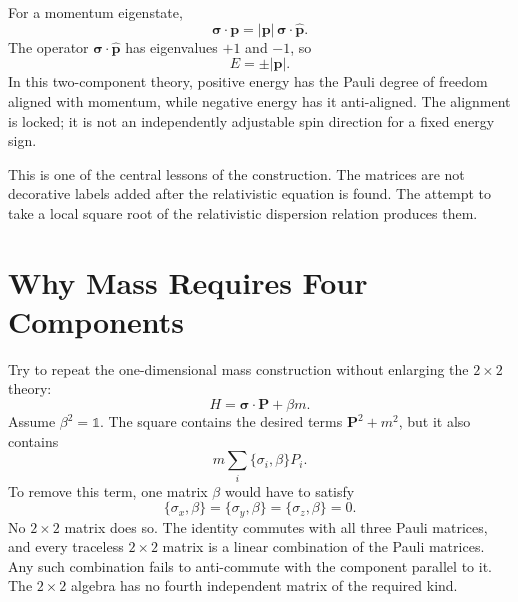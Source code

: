 For a momentum eigenstate,
\begin{equation}
\boldsymbol{\sigma}\cdot\mathbf p
=
|\mathbf p|\,\boldsymbol{\sigma}\cdot\widehat{\mathbf p}.
\end{equation}
The operator \(\boldsymbol{\sigma}\cdot\widehat{\mathbf p}\) has eigenvalues \(+1\) and \(-1\), so
\begin{equation}
E=\pm|\mathbf p|.
\end{equation}
In this two-component theory, positive energy has the Pauli degree of freedom aligned with momentum, while negative energy has it anti-aligned. The alignment is locked; it is not an independently adjustable spin direction for a fixed energy sign.

\begin{classroomqa}
\end{classroomqa}

This is one of the central lessons of the construction. The matrices are not decorative labels added after the relativistic equation is found. The attempt to take a local square root of the relativistic dispersion relation produces them.

\section{Why Mass Requires Four Components}

Try to repeat the one-dimensional mass construction without enlarging the \(2\times2\) theory:
\begin{equation}
H=\boldsymbol{\sigma}\cdot\mathbf P+\beta m.
\label{eq:l10-failed-mass}
\end{equation}
Assume \(\beta^2=\mathbb{1}\). The square contains the desired terms \(\mathbf P^2+m^2\), but it also contains
\begin{equation}
m\sum_i\{\sigma_i,\beta\}P_i.
\end{equation}
To remove this term, one matrix \(\beta\) would have to satisfy
\begin{equation}
\{\sigma_x,\beta\}
=
\{\sigma_y,\beta\}
=
\{\sigma_z,\beta\}
=0.
\label{eq:l10-impossible-beta}
\end{equation}
No \(2\times2\) matrix does so. The identity commutes with all three Pauli matrices, and every traceless \(2\times2\) matrix is a linear combination of the Pauli matrices. Any such combination fails to anti-commute with the component parallel to it. The \(2\times2\) algebra has no fourth independent matrix of the required kind.

